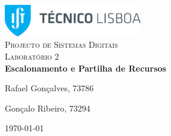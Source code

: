 \begin{titlepage}

\begin{center}

\includegraphics[width=6cm]{./title}\\[3cm]

\textsc{\LARGE Projecto de Sistemas Digitais}\\[1.5cm]

\textsc{\Large Laboratório 2}\\[1.5cm]


{ \huge \bfseries Escalonamento e Partilha de Recursos \\[3cm] }


\noindent
\begin{minipage}{0.4\textwidth}
\begin{flushleft} \large
Rafael Gonçalves, 73786
\end{flushleft}
\end{minipage}
\begin{minipage}{0.4\textwidth}
\begin{flushright} \large
Gonçalo Ribeiro, 73294
\end{flushright}
\end{minipage}

\vfill

{\large \today}


\end{center}

\end{titlepage}